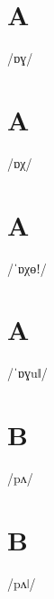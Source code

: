 \documentclass[10pt,a4paper,twoside]{book}
\begin{document}
\section*{A}

\begin{multicols}{3}
 {/ɒɣ/} {}
\end{multicols}

\section*{A}

\begin{multicols}{3}
 {/ɒχ/} {}
\end{multicols}

\section*{A}

\begin{multicols}{3}
 {/ˈɒχɵǃ/} {}
\end{multicols}

\section*{A}

\begin{multicols}{3}
 {/ˈɒɣuǁ/} {}
\end{multicols}

\section*{B}

\begin{multicols}{3}
 {/pʌ/} {}
\end{multicols}

\section*{B}

\begin{multicols}{3}
 {/pʌǀ/} {}
\end{multicols}
\end{document}
